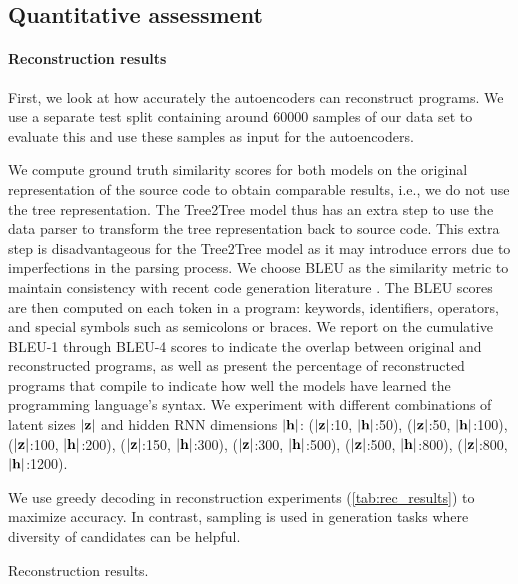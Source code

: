 \subsection{Quantitative assessment}

\paragraph{Reconstruction results}\label{sec:recon-results}
First, we look at how accurately the autoencoders can reconstruct programs. We use a separate test split containing around 60000 samples of our data set to evaluate this and use these samples as input for the autoencoders. 


We compute ground truth similarity scores for both models on the original representation of the source code to obtain comparable results, i.e., we do not use the tree representation.
The Tree2Tree model thus has an extra step to use the data parser to transform the tree representation back to source code. This extra step is disadvantageous for the Tree2Tree model as it may introduce errors due to imperfections in the parsing process. 
We choose BLEU \cite{papineni2002bleu} as the similarity metric to maintain consistency with recent code generation literature \cite[table I]{evtikhievOutBLEUHow2023}.
The BLEU scores are then computed on each token in a program: keywords, identifiers, operators, and special symbols such as semicolons or braces. 
We report on the cumulative BLEU-1 through BLEU-4 scores to indicate the overlap between original and reconstructed programs, as well as present the percentage of reconstructed programs that compile to indicate how well the models have learned the programming language's syntax. We experiment with different combinations of latent sizes $|\mathbf{z}|$ and hidden RNN dimensions $|\mathbf{h}|$:  ($|\mathbf{z}|$:10,  $|\mathbf{h}|$:50), ($|\mathbf{z}|$:50, $|\mathbf{h}|$:100), ($|\mathbf{z}|$:100, $|\mathbf{h}|$:200), ($|\mathbf{z}|$:150, $|\mathbf{h}|$:300), ($|\mathbf{z}|$:300, $|\mathbf{h}|$:500), ($|\mathbf{z}|$:500, $|\mathbf{h}|$:800), ($|\mathbf{z}|$:800, $|\mathbf{h}|$:1200).


We use greedy decoding in reconstruction experiments (\ref{tab:rec_results}) to maximize accuracy. In contrast, sampling is used in generation tasks where diversity of candidates can be helpful.

\begin{table}
\centering

\caption{Reconstruction results.}
\label{tab:rec_results}
\end{table}

